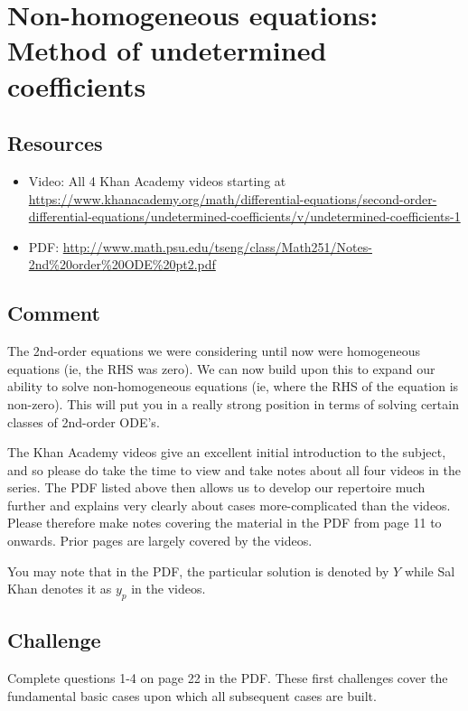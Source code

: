 \newpage
\section{Non-homogeneous equations: Method of undetermined coefficients}

\subsection*{Resources}
\begin{itemize}
    \item Video: All 4 Khan Academy videos starting at \url{https://www.khanacademy.org/math/differential-equations/second-order-differential-equations/undetermined-coefficients/v/undetermined-coefficients-1}
    \item PDF: \url{http://www.math.psu.edu/tseng/class/Math251/Notes-2nd\%20order\%20ODE\%20pt2.pdf}
\end{itemize}

\subsection*{Comment}
The 2nd-order equations we were considering until now were homogeneous equations (ie, the RHS was zero). We can now build upon this to expand our ability to solve non-homogeneous equations (ie, where the RHS of the equation is non-zero). This will put you in a really strong position in terms of solving certain classes of 2nd-order ODE's.

The Khan Academy videos give an excellent initial introduction to the subject, and so please do take the time to view and take notes about all four videos in the series. The PDF listed above then allows us to develop our repertoire much further and explains very clearly about cases more-complicated than the videos. Please therefore make notes covering the material in the PDF from page 11 to onwards. Prior pages are largely covered by the videos.

You may note that in the PDF, the particular solution is denoted by $Y$ while Sal Khan denotes it as $y_p$ in the videos.

\subsection*{Challenge}
Complete questions 1-4 on page 22 in the PDF. These first challenges cover the fundamental basic cases upon which all subsequent cases are built.

